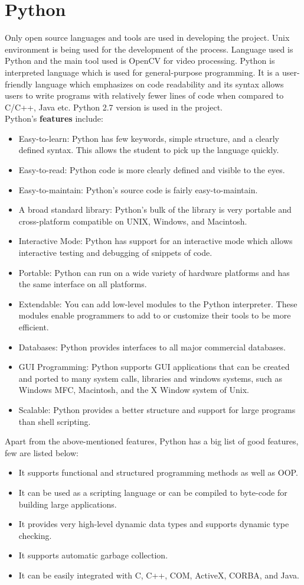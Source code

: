 \section{Python}
Only open source languages and tools are used in developing the project. Unix environment is being used for the development of the process.
Language used is Python and the main tool used is OpenCV for video processing. Python is interpreted language which is used for general-purpose programming. It is a user-friendly language which emphasizes on code readability and its syntax allows users to write programs with relatively fewer lines of code when compared to C/C++, Java etc. Python 2.7 version is used in the project.\\
Python's \textbf{features} include:
\begin{itemize}
\item Easy-to-learn: Python has few keywords, simple structure, and a clearly defined syntax. This allows the student to pick up the language quickly.
\item Easy-to-read: Python code is more clearly defined and visible to the eyes.
\item Easy-to-maintain: Python's source code is fairly easy-to-maintain.
\item A broad standard library: Python's bulk of the library is very portable and cross-platform compatible on UNIX, Windows, and Macintosh.
\item Interactive Mode: Python has support for an interactive mode which allows interactive testing and debugging of snippets of code.
\item Portable: Python can run on a wide variety of hardware platforms and has the same interface on all platforms.
\item Extendable: You can add low-level modules to the Python interpreter. These modules enable programmers to add to or customize their tools to be more efficient.
\item Databases: Python provides interfaces to all major commercial databases.
\item GUI Programming: Python supports GUI applications that can be created and ported to many system calls, libraries and windows systems, such as Windows MFC, Macintosh, and the X Window system of Unix.
\item Scalable: Python provides a better structure and support for large programs than shell scripting.
\end{itemize}
Apart from the above-mentioned features, Python has a big list of good features, few are listed below:
\begin{itemize}
	\item It supports functional and structured programming methods as well as OOP.
\item It can be used as a scripting language or can be compiled to byte-code for building large applications.
\item It provides very high-level dynamic data types and supports dynamic type checking.
\item It supports automatic garbage collection.
\item It can be easily integrated with C, C++, COM, ActiveX, CORBA, and Java.

\end{itemize}
